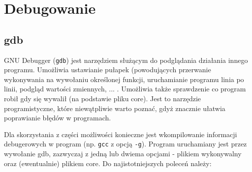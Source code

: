% 
% 
% 
% 

\section{Debugowanie}

\subsection{gdb}

GNU Debugger (\Verb$gdb$) jest narzędziem służącym do podglądania działania innego programu.
Umożliwia ustawianie pułapek (powodujących przerwanie wykonywania na wywołaniu określonej funkcji, uruchamianie programu linia po linii, podgląd wartości zmiennych, ... .
Umożliwia także sprawdzenie co program robił gdy się wywalił (na podstawie pliku core).
Jest to narzędzie programistyczne, które niewątpliwie warto poznać, gdyż znacznie ułatwia poprawianie błędów w programach.

Dla skorzystania z części możliwości konieczne jest wkompilowanie informacji debugerowych w program (np. \Verb$gcc$ z opcją \Verb$-g$).
Program uruchamiany jest przez wywołanie gdb, zazwyczaj z jedną lub dwiema opcjami - plikiem wykonywalny oraz (ewentualnie) plikiem core. Do najistotniejszych poleceń należy:

